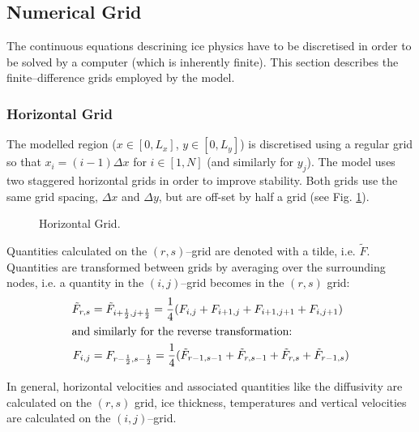 \subsection{Numerical Grid}\label{num.sec.grid}
The continuous equations descrining ice physics have to be discretised in order to be solved by a computer (which is inherently finite). This section describes the finite--difference grids employed by the model.
\subsubsection{Horizontal Grid}
The modelled region ($x\in[0,L_x]$, $y\in[0,L_y]$) is discretised using a regular grid so that $x_i=(i-1)\Delta x$ for $i\in[1,N]$ (and similarly for $y_j$). The model uses two staggered horizontal grids in order to improve stability. Both grids use the same grid spacing, $\Delta x$ and $\Delta y$, but are off-set by half a grid (see Fig. \ref{kin.fig.grid}). 
\begin{figure}[htbp]
  \begin{center}
    
    \caption{Horizontal Grid.}
    \label{kin.fig.grid}
  \end{center}
\end{figure}
Quantities calculated on the $(r,s)$--grid are denoted with a tilde, i.e. $\tilde{F}$. Quantities are transformed between grids by averaging over the surrounding nodes, i.e. a quantity in the $(i,j)$--grid becomes in the $(r,s)$ grid:
\begin{subequations}
  \begin{align}
    \tilde{F}_{r,s}&=\tilde{F}_{i+\frac12,j+\frac12}=\frac14(F_{i,j}+F_{i+1,j}+F_{i+1,j+1}+F_{i,j+1})\\
    \intertext{and similarly for the reverse transformation:}
    F_{i,j}&=F_{r-\frac12,s-\frac12}=\frac14(\tilde{F}_{r-1,s-1}+\tilde{F}_{r,s-1}+\tilde{F}_{r,s}+\tilde{F}_{r-1,s})
  \end{align}
\end{subequations}

In general, horizontal velocities and associated quantities like the diffusivity are calculated on the $(r,s)$ grid, ice thickness, temperatures and vertical velocities are calculated on the $(i,j)$--grid.

